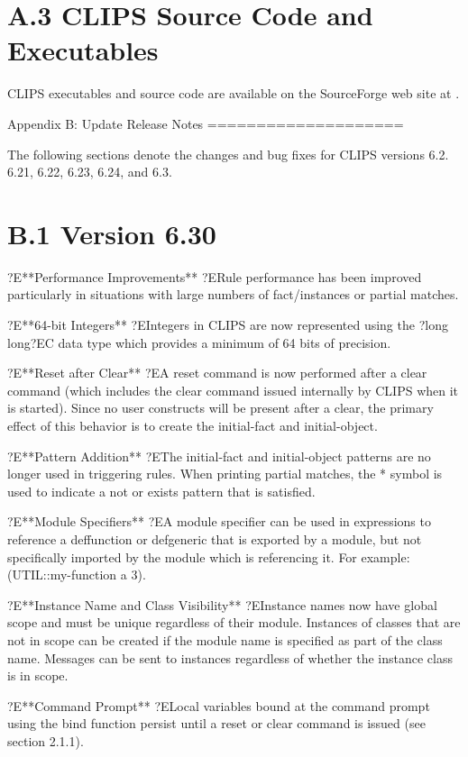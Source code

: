 \documentclass[letterpaper,10pt,english]{sphinxmanual}
\begin{document}
\section{A.3 CLIPS Source Code and Executables}
\label{\detokenize{appendix:a-3-clips-source-code-and-executables}}
CLIPS executables and source code are available on the SourceForge web
site at .

Appendix B:
Update Release Notes
====================

The following sections denote the changes and bug fixes for CLIPS
versions 6.2. 6.21, 6.22, 6.23, 6.24, and 6.3.


\section{B.1 Version 6.30}
\label{\detokenize{appendix:b-1-version-6-30}}
?E**Performance Improvements** ?ERule performance has been improved
particularly in situations with large numbers of fact/instances or
partial matches.

?E**64-bit Integers** ?EIntegers in CLIPS are now represented using the
?long long?EC data type which provides a minimum of 64 bits of
precision.

?E**Reset after Clear** ?EA reset command is now performed after a clear
command (which includes the clear command issued internally by CLIPS
when it is started). Since no user constructs will be present after a
clear, the primary effect of this behavior is to create the initial-fact
and initial-object.

?E**Pattern Addition** ?EThe initial-fact and initial-object patterns
are no longer used in triggering rules. When printing partial matches,
the * symbol is used to indicate a not or exists pattern that is
satisfied.

?E**Module Specifiers** ?EA module specifier can be used in expressions
to reference a deffunction or defgeneric that is exported by a module,
but not specifically imported by the module which is referencing it. For
example: (UTIL::my-function a 3).

?E**Instance Name and Class Visibility** ?EInstance names now have
global scope and must be unique regardless of their module. Instances of
classes that are not in scope can be created if the module name is
specified as part of the class name. Messages can be sent to instances
regardless of whether the instance class is in scope.

?E**Command Prompt** ?ELocal variables bound at the command prompt using
the bind function persist until a reset or clear command is issued (see
section 2.1.1).
\end{document}
